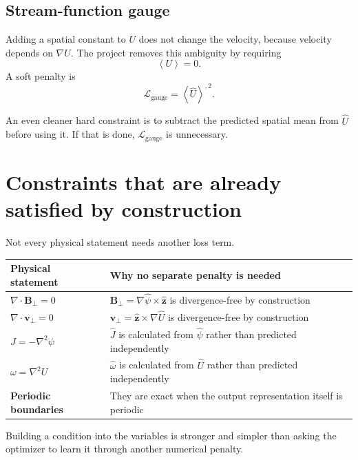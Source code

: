 \documentclass[11pt]{article}
\newcommand{\avg}[1]{\left\langle #1\right\rangle}
\newcommand{\Lgauge}{\mathcal L_{\mathrm{gauge}}}
\begin{document}
\subsection{Stream-function gauge}

Adding a spatial constant to $U$ does not change the velocity, because velocity depends on $\nabla U$. The project removes this ambiguity by requiring
\begin{equation}
\avg{U}=0.
\end{equation}
A soft penalty is
\begin{equation}
\boxed{
\Lgauge=\avg{\widehat U}^{,2}.
}
\label{eq:lgauge}
\end{equation}

An even cleaner hard constraint is to subtract the predicted spatial mean from $\widehat U$ before using it. If that is done, $\Lgauge$ is unnecessary.

\section{Constraints that are already satisfied by construction}

Not every physical statement needs another loss term.

\begin{center}
\begin{tabularx}{0.94\textwidth}{>{\bfseries}p{} X}
\toprule
Physical statement & Why no separate penalty is needed\\
\midrule
$\nabla\cdot\bm B_\perp=0$ & $\bm B_\perp=\nabla\widehat\psi\times\widehat{\bm z}$ is divergence-free by construction\\
$\nabla\cdot\bm v_\perp=0$ & $\bm v_\perp=\widehat{\bm z}\times\nabla\widehat U$ is divergence-free by construction\\
$J=-\nabla^2\psi$ & $\widehat J$ is calculated from $\widehat\psi$ rather than predicted independently\\
$\omega=\nabla^2U$ & $\widehat\omega$ is calculated from $\widehat U$ rather than predicted independently\\
Periodic boundaries & They are exact when the output representation itself is periodic\\
\bottomrule
\end{tabularx}
\end{center}

Building a condition into the variables is stronger and simpler than asking the optimizer to learn it through another numerical penalty.
\end{document}
